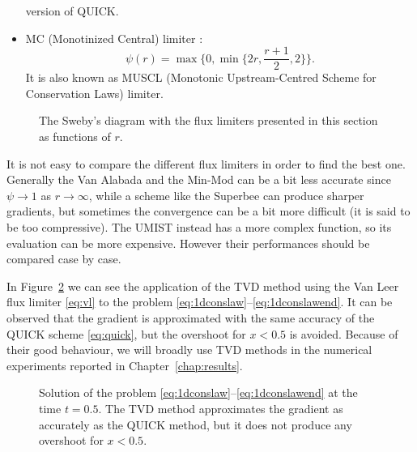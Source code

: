 \begin{itemize}
	version of QUICK.
%
	\item MC (Monotinized Central) limiter \cite{tvd:mclimiter}:
	\begin{equation} \label{eq:mclim}
	\psi(r)=\max \bigg\{0, \min \bigg\{ 2r, \frac{r+1}{2}, 2\bigg\} \bigg\}.
	\end{equation}
	It is also known as MUSCL (Monotonic Upstream-Centred Scheme for 
	Conservation Laws) limiter.
%	
\end{itemize}
\begin{figure}[t]
	\centering
	
	\caption[Flux limiter functions]{The Sweby's diagram with the flux limiters 
	presented in this section as functions of $r$.}
	\label{fig:fluxlimiters}
\end{figure}

It is not easy to compare the different flux limiters in order to find the 
best one. Generally the Van Alabada and the Min-Mod can be a bit less accurate 
since $\psi \rightarrow 1$ as $r \rightarrow \infty$, while a scheme like the 
Superbee can produce sharper gradients, but sometimes the convergence can be a 
bit more difficult (it is said to be too compressive). The UMIST instead has a 
more complex function, so its evaluation can be more expensive. However their 
performances should be compared case by case.

In Figure~\ref{fig:1dconslawtvd} we can see the application of the TVD method 
using the Van Leer flux limiter \eqref{eq:vl} to the problem 
\eqref{eq:1dconslaw}--\eqref{eq:1dconslawend}. It can be observed that the 
gradient is approximated with the same accuracy of the QUICK scheme 
\eqref{eq:quick}, but the overshoot for $x<0.5$ is avoided. Because of their 
good behaviour, we will broadly use TVD methods in the numerical experiments 
reported in Chapter~\ref{chap:results}.
\begin{figure}
	\centering
	
	\caption[Solution of a one-dimensional scalar conservation law using a TVD 
	method]{Solution of the problem 
	\eqref{eq:1dconslaw}--\eqref{eq:1dconslawend} at the time 
	$t=0.5$. The TVD method approximates the gradient as accurately as the 
	QUICK method, but it does not produce any overshoot for $x<0.5$.}
	\label{fig:1dconslawtvd}
\end{figure}
%
